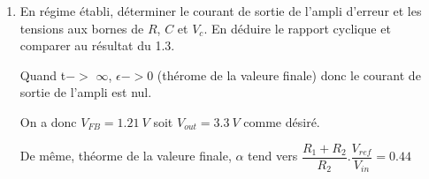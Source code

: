 \begin{enumerate}
\begin{enumerate}
\begin{center}
Au démarrage : $V_{FB}=0$ et le condensateur est déchargé : $V^+=R.g_m.\epsilon=1.2R.g_m$

$\alpha=0.5*1.2R.g_m\rightarrow R=\dfrac{\alpha}{0.6g_m}=186\Omega$

Constante de temps du correcteur : $T_i=R.C>10\sqrt{L_1.C_1}\rightarrow C>\dfrac{10}{R}.\sqrt{L_1.C_1}=230\ nF$
\end{center}

\item En régime établi, déterminer le courant de sortie de l'ampli d'erreur et les tensions aux bornes de $R$, $C$ et $V_c$. En déduire le rapport cyclique et comparer au résultat du 1.3.

Quand t$->$ $\infty$, $\epsilon -> 0$ (thérome de la valeure finale) donc le courant de sortie de l'ampli est nul. 

On a donc $V_{FB}=1.21\ V$ soit $V_{out}=3.3\ V$ comme désiré.

De même, théorme de la valeure finale, $\alpha$ tend vers $\dfrac{R_1+R_2}{R_2}.\dfrac{V_{ref}}{V_{in}}=0.44$


\end{enumerate}

\end{enumerate}

\newpage

